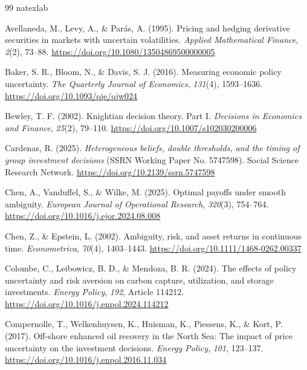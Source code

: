 \begin{thebibliography}{99}
\expandafter\ifx\csname natexlab\endcsname\relax\def\natexlab#1{#1}\fi

Avellaneda, M., Levy, A., \& Par\'as, A. (1995). Pricing and hedging derivative securities in markets with uncertain volatilities. \emph{Applied Mathematical Finance}, \emph{2}(2), 73--88. \url{https://doi.org/10.1080/13504869500000005}

Baker, S. R., Bloom, N., \& Davis, S. J. (2016). Measuring economic policy uncertainty. \emph{The Quarterly Journal of Economics}, \emph{131}(4), 1593--1636. \url{https://doi.org/10.1093/qje/qjw024}

Bewley, T. F. (2002). Knightian decision theory. Part I. \emph{Decisions in Economics and Finance}, \emph{25}(2), 79--110. \url{https://doi.org/10.1007/s102030200006}

Cardenas, R. (2025). \emph{Heterogeneous beliefs, double thresholds, and the timing of group investment decisions} (SSRN Working Paper No. 5747598). Social Science Research Network. \url{https://doi.org/10.2139/ssrn.5747598}

Chen, A., Vanduffel, S., \& Wilke, M. (2025). Optimal payoffs under smooth ambiguity. \emph{European Journal of Operational Research}, \emph{320}(3), 754--764. \url{https://doi.org/10.1016/j.ejor.2024.08.008}

Chen, Z., \& Epstein, L. (2002). Ambiguity, risk, and asset returns in continuous time. \emph{Econometrica}, \emph{70}(4), 1403--1443. \url{https://doi.org/10.1111/1468-0262.00337}

Colombe, C., Leibowicz, B. D., \& Mendoza, B. R. (2024). The effects of policy uncertainty and risk aversion on carbon capture, utilization, and storage investments. \emph{Energy Policy}, \emph{192}, Article 114212. \url{https://doi.org/10.1016/j.enpol.2024.114212}

Compernolle, T., Welkenhuysen, K., Huisman, K., Piessens, K., \& Kort, P. (2017). Off-shore enhanced oil recovery in the North Sea: The impact of price uncertainty on the investment decisions. \emph{Energy Policy}, \emph{101}, 123--137. \url{https://doi.org/10.1016/j.enpol.2016.11.034}


\end{thebibliography}
